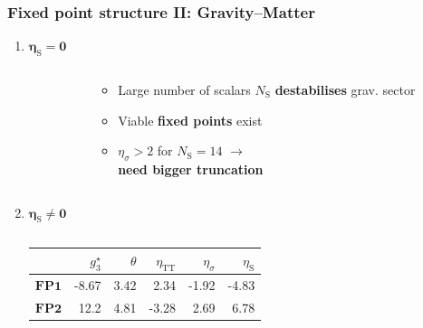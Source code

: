 \documentclass[]{beamer}  %
\newcommand\TTspace{ 0pt }
\newcommand\NS{ N_{\scriptscriptstyle{\mathrm{S}}} }
\newcommand\etaS{ \eta_{\scriptscriptstyle{\mathrm{S}}} }
\newcommand\etaTT{ \eta_{\scriptscriptstyle{\mathrm{T\hspace{\TTspace}T}}} }
\newcommand{\FPone}  {\textbf{FP1}}
\newcommand{\FPtwo}  {\textbf{FP2}}
\begin{document}
\begin{frame}
  \frametitle{Fixed point structure II: Gravity--Matter}

  \begin{enumerate}

      \vspace{5pt}
    \item
      $\mathbf{\boxed{\etaS = 0}}$

      \vspace{2pt}
      \begin{columns}[T]
        \begin{column}{.8\textwidth}
          
        \end{column}

        \hspace{-80pt}
        \begin{column}{.4\textwidth}
          \begin{center}
            \vspace{30pt}
            \begin{itemize}
            \item
              Large number of scalars $\NS$ \textbf{destabilises} grav. sector
            \item
              Viable \textbf{fixed points} exist
            \item
              $\eta_\sigma > 2$ for $\NS=14$ $\rightarrow$\\ \textbf{need bigger truncation}
          \end{itemize}
          \end{center}
        \end{column}
      \end{columns}

      \vspace{7pt}
    \item
      $\mathbf{\boxed{\etaS \neq 0}}$

      \vspace{-10pt}
      \begin{columns}[T]
        \begin{column}{.6\textwidth}
          \begin{center}
            \renewcommand{\arraystretch}{1.5}
            \begin{tabular}{ r r r r r r }
              & $g_{3}^\star$ & $\theta$ & $\etaTT$        & $\eta_{\sigma}$ & $\etaS$ \\
              \hline
              $\FPone$    & -8.67          & 3.42     & 2.34            & -1.92           & -4.83   \\
              $\FPtwo$    & 12.2           & 4.81     & -3.28           & 2.69            & 6.78    \\
            \end{tabular}
          \end{center}
        \end{column}


\end{columns}
\end{enumerate}
\end{frame}
\end{document}
